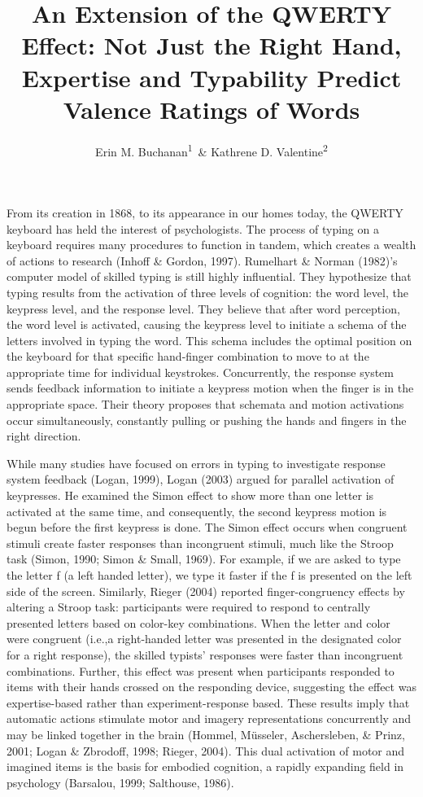 \documentclass[english,man]{apa6}
\title{An Extension of the QWERTY Effect: Not Just the Right Hand, Expertise
and Typability Predict Valence Ratings of Words}
\author{Erin M. Buchanan\textsuperscript{1}~\& Kathrene D. Valentine\textsuperscript{2}}
\affiliation{
    \vspace{0.5cm}
          \textsuperscript{1} Missouri State University\\
          \textsuperscript{2} University of Missouri  }
\theoremstyle{definition}
\theoremstyle{definition}
\theoremstyle{definition}
\theoremstyle{remark}
\begin{document}
\maketitle

\setcounter{secnumdepth}{0}



From its creation in 1868, to its appearance in our homes today, the
QWERTY keyboard has held the interest of psychologists. The process of
typing on a keyboard requires many procedures to function in tandem,
which creates a wealth of actions to research (Inhoff \& Gordon, 1997).
Rumelhart \& Norman (1982)'s computer model of skilled typing is still
highly influential. They hypothesize that typing results from the
activation of three levels of cognition: the word level, the keypress
level, and the response level. They believe that after word perception,
the word level is activated, causing the keypress level to initiate a
schema of the letters involved in typing the word. This schema includes
the optimal position on the keyboard for that specific hand-finger
combination to move to at the appropriate time for individual
keystrokes. Concurrently, the response system sends feedback information
to initiate a keypress motion when the finger is in the appropriate
space. Their theory proposes that schemata and motion activations occur
simultaneously, constantly pulling or pushing the hands and fingers in
the right direction.

While many studies have focused on errors in typing to investigate
response system feedback (Logan, 1999), Logan (2003) argued for parallel
activation of keypresses. He examined the Simon effect to show more than
one letter is activated at the same time, and consequently, the second
keypress motion is begun before the first keypress is done. The Simon
effect occurs when congruent stimuli create faster responses than
incongruent stimuli, much like the Stroop task (Simon, 1990; Simon \&
Small, 1969). For example, if we are asked to type the letter f (a left
handed letter), we type it faster if the f is presented on the left side
of the screen. Similarly, Rieger (2004) reported finger-congruency
effects by altering a Stroop task: participants were required to respond
to centrally presented letters based on color-key combinations. When the
letter and color were congruent (i.e.,a right-handed letter was
presented in the designated color for a right response), the skilled
typists' responses were faster than incongruent combinations. Further,
this effect was present when participants responded to items with their
hands crossed on the responding device, suggesting the effect was
expertise-based rather than experiment-response based. These results
imply that automatic actions stimulate motor and imagery representations
concurrently and may be linked together in the brain (Hommel, Müsseler,
Aschersleben, \& Prinz, 2001; Logan \& Zbrodoff, 1998; Rieger, 2004).
This dual activation of motor and imagined items is the basis for
embodied cognition, a rapidly expanding field in psychology (Barsalou,
1999; Salthouse, 1986).
\end{document}
